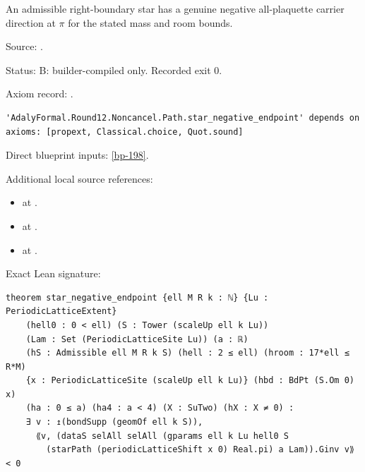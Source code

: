 \begin{theorem}[bp-199]
\label{bp-199}
\leanok
An admissible right-boundary star has a genuine negative all-plaquette carrier direction at \(\pi\) for the stated mass and room bounds.

\par Source: \texttt{}.
\par Status: B: builder-compiled only. Recorded exit 0.
\par Axiom record: \texttt{}.
\begin{verbatim}
'AdalyFormal.Round12.Noncancel.Path.star_negative_endpoint' depends on axioms: [propext, Classical.choice, Quot.sound]
\end{verbatim}
\par Direct blueprint inputs: \ref{bp-198}.
\par Additional local source references:
\begin{itemize}
\item \texttt{} at \texttt{}.
\item \texttt{} at \texttt{}.
\item \texttt{} at \texttt{}.
\end{itemize}
\par Exact Lean signature:
\begin{verbatim}
theorem star_negative_endpoint {ell M R k : ℕ} {Lu : PeriodicLatticeExtent}
    (hell0 : 0 < ell) (S : Tower (scaleUp ell k Lu))
    (Lam : Set (PeriodicLatticeSite Lu)) (a : ℝ)
    (hS : Admissible ell M R k S) (hell : 2 ≤ ell) (hroom : 17*ell ≤ R*M)
    {x : PeriodicLatticeSite (scaleUp ell k Lu)} (hbd : BdPt (S.Om 0) x)
    (ha : 0 ≤ a) (ha4 : a < 4) (X : SuTwo) (hX : X ≠ 0) :
    ∃ v : ↥(bondSupp (geomOf ell k S)),
      ⟪v, (dataS selAll selAll (gparams ell k Lu hell0 S
        (starPath (periodicLatticeShift x 0) Real.pi) a Lam)).Ginv v⟫ < 0
\end{verbatim}
\end{theorem}

